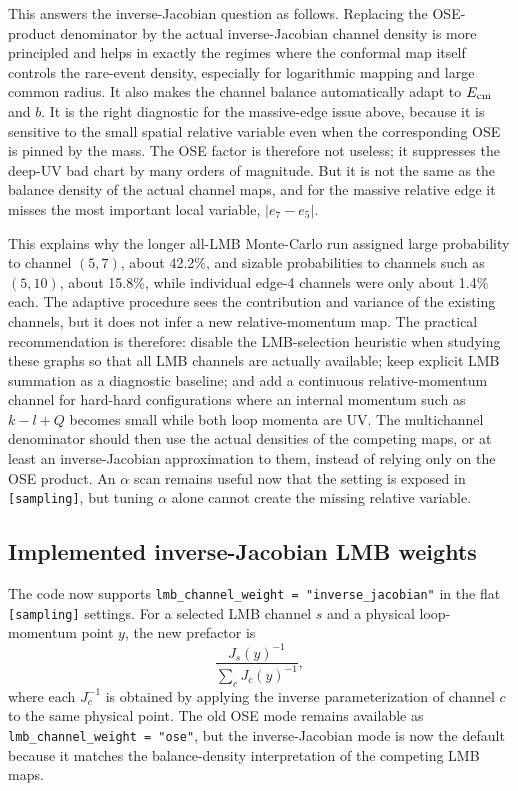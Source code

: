 \documentclass[11pt]{article}
\begin{document}
This answers the inverse-Jacobian question as follows.  Replacing the
OSE-product denominator by the actual inverse-Jacobian channel density is more
principled and helps in exactly the regimes where the conformal map itself
controls the rare-event density, especially for logarithmic mapping and large
common radius.  It also makes the channel balance automatically adapt to
$E_{\rm cm}$ and $b$.  It is the right diagnostic for the massive-edge issue
above, because it is sensitive to the small spatial relative variable even when
the corresponding OSE is pinned by the mass.  The OSE factor is therefore not
useless; it suppresses the deep-UV bad chart by many orders of magnitude.  But
it is not the same as the balance density of the actual channel maps, and for
the massive relative edge it misses the most important local variable,
$|e_7-e_5|$.

This explains why the longer all-LMB Monte-Carlo run assigned large
probability to channel $(5,7)$, about 42.2\%, and sizable probabilities to
channels such as $(5,10)$, about 15.8\%, while individual edge-4 channels were
only about 1.4\% each.  The adaptive procedure sees the contribution and
variance of the existing channels, but it does not infer a new
relative-momentum map.  The practical recommendation is therefore:
disable the LMB-selection heuristic when studying these graphs so that all LMB
channels are actually available; keep explicit LMB summation as a diagnostic
baseline; and add a continuous relative-momentum channel for hard-hard
configurations where an internal momentum such as $k-l+Q$ becomes small while
both loop momenta are UV.  The multichannel denominator should then use the
actual densities of the competing maps, or at least an inverse-Jacobian
approximation to them, instead of relying only on the OSE product.  An
$\alpha$ scan remains useful now that the setting is exposed in
\texttt{[sampling]}, but tuning $\alpha$ alone cannot create the missing
relative variable.

\subsection{Implemented inverse-Jacobian LMB weights}

The code now supports
\texttt{lmb\_channel\_weight = "inverse\_jacobian"} in the flat
\texttt{[sampling]} settings.  For a selected LMB channel $s$ and a physical
loop-momentum point $y$, the new prefactor is
\begin{equation}
  \frac{J_s(y)^{-1}}{\sum_c J_c(y)^{-1}},
\end{equation}
where each $J_c^{-1}$ is obtained by applying the inverse parameterization of
channel $c$ to the same physical point.  The old OSE mode remains available as
\texttt{lmb\_channel\_weight = "ose"}, but the inverse-Jacobian mode is now the
default because it matches the balance-density interpretation of the competing
LMB maps.
\end{document}
